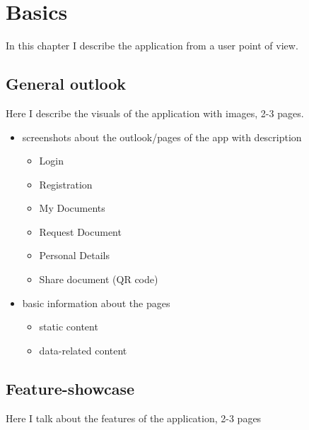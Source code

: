 \chapter{Basics}\label{ch:BASIC}

\begin{summary}
	In this chapter I describe the application from a user point of view.
\end{summary}

\section{General outlook}\label{sec:BASIC:go}
Here I describe the visuals of the application with images, 2-3 pages.

\begin{itemize}
	\item screenshots about the outlook/pages of the app with description
	\begin{itemize}
		\item Login
		\item Registration
		\item My Documents
		\item Request Document
		\item Personal Details
		\item Share document (QR code)
	\end{itemize}
	\item basic information about the pages
	\begin{itemize}
		\item static content
		\item data-related content
	\end{itemize}
\end{itemize}


\section{Feature-showcase}\label{sec:BASIC:fs}
Here I talk about the features of the application, 2-3 pages

